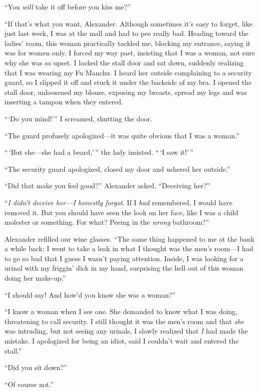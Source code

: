``You \emph{will} take it off before you kiss me?''

``If that's what you want, Alexander. Although sometimes it's easy to
forget, like just last week, I was at the mall and had to pee really
bad. Heading toward the ladies' room, this woman practically tackled me,
blocking my entrance, saying it was for women only. I forced my way
past, insisting that I was a woman, not sure why she was so upset. I
locked the stall door and sat down, suddenly realizing that I was
wearing my Fu Manchu. I heard her outside complaining to a security
guard, so I slipped it off and stuck it under the backside of my bra. I
opened the stall door, unloosened my blouse, exposing my breasts, spread
my legs and was inserting a tampon when they entered.

```Do you mind!''' I screamed, shutting the door.

``The guard profusely apologized---it was quite obvious that I was a
woman.''

``\,`But she---she had a beard,'\,'' the lady insisted. ``\,`I saw
it!'\,''

``The security guard apologized, closed my door and ushered her
outside.''

``Did that make you feel good?'' Alexander asked. ``Deceiving her?''

``\emph{I didn't deceive her---I honestly forgot}. If I \emph{had}
remembered, I would have removed it. But you should have seen the look
on her face, like I was a child molester or something. For what? Peeing
in the \emph{wrong} bathroom?''

Alexander refilled our wine glasses. ``The same thing happened to me at
the bank a while back: I went to take a leak in what I thought was the
men's room---I had to go so bad that I guess I wasn't paying attention.
Inside, I was looking for a urinal with my friggin' dick in my hand,
surprising the hell out of this woman doing her make-up.''

``I should say! And how'd you know she was a woman?''

``I know a woman when I see one. She demanded to know what I was doing,
threatening to call security. I still thought it was the men's room and
that \emph{she} was intruding, but not seeing any urinals, I slowly
realized that \emph{I} had made the mistake. I apologized for being an
idiot, said I couldn't wait and entered the stall.''

``Did you sit down?''

``Of course not.''

